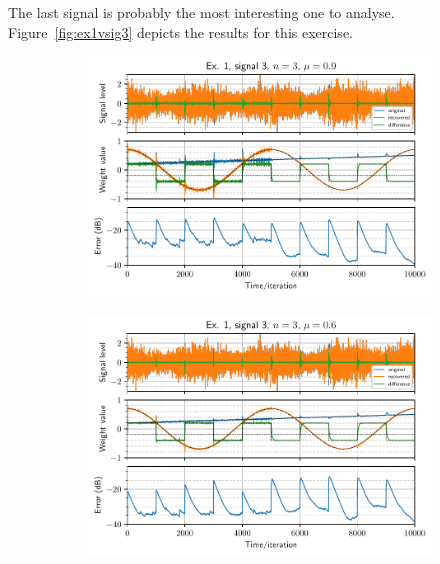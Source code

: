 The last signal is probably the most interesting one to analyse.
Figure~\ref{fig:ex1vsig3} depicts the results for this exercise.
\begin{figure}[h]
    \centering
    \begin{subfigure}[t]{0.30\columnwidth}
        \centering
        \includegraphics[width=\columnwidth]{figures/pdf/ex1_l3_n3_mu90.pdf}
        \caption{}
    \end{subfigure} \hfill
    \begin{subfigure}[t]{0.30\columnwidth}
        \centering
        \includegraphics[width=\columnwidth]{figures/pdf/ex1_l3_n3_mu60.pdf}
        \caption{}
    \end{subfigure} \hfill
    \begin{subfigure}[t]{0.30\columnwidth}
        \centering

\end{subfigure}
\end{figure}
